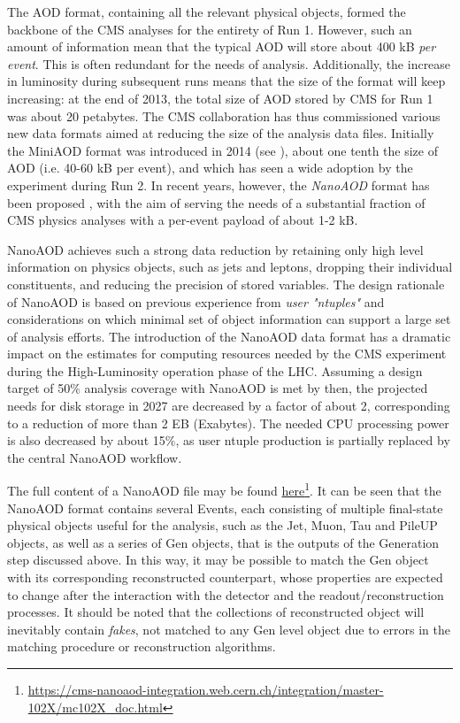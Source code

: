 The AOD format, containing all the relevant physical objects, formed the backbone of the CMS analyses for the entirety of Run 1. However, such an amount of information mean that the typical AOD will store about 400 kB \emph{per event}. This is often redundant for the needs of analysis. Additionally, the increase in luminosity during subsequent runs means that the size of the format will keep increasing: at the end of 2013, the total size of AOD stored by CMS for Run 1 was about 20 petabytes. The CMS collaboration has thus commissioned various new data formats aimed at reducing the size of the analysis data files.
Initially the MiniAOD format was introduced in 2014 (see \cite{Petrucciani_2015}), about one tenth the size of AOD (i.e. 40-60 kB per event), and which has seen a wide adoption by the experiment during Run 2. In recent years, however, the \emph{NanoAOD} format has been proposed \cite{Peruzzi_2020}, with the aim of serving the needs of a substantial fraction of CMS physics analyses with a per-event payload of about 1-2 kB.

NanoAOD achieves such a strong data reduction by retaining only high level information on physics objects, such as jets and leptons, dropping their individual constituents, and reducing the precision of stored variables.
The design rationale of NanoAOD is based on previous experience from \emph{user "ntuples"} and considerations on which minimal set of object information can support a large set of analysis efforts. The introduction of the NanoAOD data format has a dramatic impact on the estimates for computing resources needed by the CMS experiment during the High-Luminosity operation phase of the LHC. Assuming a design target of 50$\%$ analysis coverage with NanoAOD is met by then, the projected needs for disk storage in 2027 are decreased by a factor of about 2, corresponding to a reduction of more than 2 EB (Exabytes). The needed CPU processing power is also decreased by about 15$\%$, as user ntuple production is partially replaced by the central NanoAOD workflow. 

The full content of a NanoAOD file may be found \href{https://cms-nanoaod-integration.web.cern.ch/integration/master-102X/mc102X_doc.html}{here}\footnote{\url{https://cms-nanoaod-integration.web.cern.ch/integration/master-102X/mc102X_doc.html}}. It can be seen that the NanoAOD format contains several Events, each consisting of multiple final-state physical objects useful for the analysis, such as the Jet, Muon, Tau and PileUP objects, as well as a series of Gen objects, that is the outputs of the Generation step discussed above. In this way, it may be possible to match the Gen object with its corresponding reconstructed counterpart, whose properties are expected to change after the interaction with the detector and the readout/reconstruction processes. It should be noted that the collections of reconstructed object will inevitably contain \emph{fakes}, not matched to any Gen level object due to errors in the matching procedure or reconstruction algorithms.

